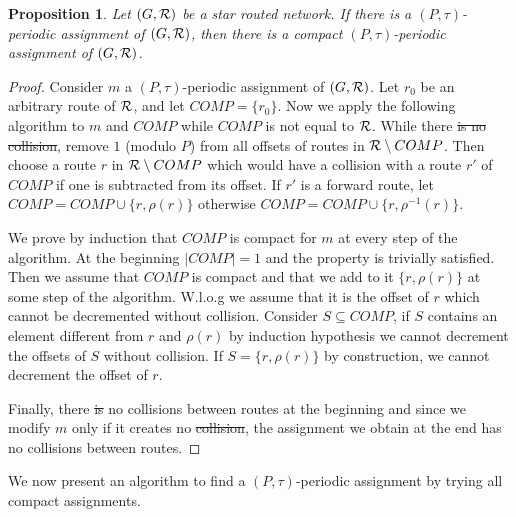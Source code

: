 \documentclass[10pt, conference, letterpaper]{IEEEtran}
\newtheorem{proposition}{Proposition}
\providecommand{\DIFaddtex}[1]{{\protect\color{blue}\uwave{#1}}} %
\providecommand{\DIFdeltex}[1]{{\protect\color{red}\sout{#1}}}                      %
\providecommand{\DIFaddbegin}{} %
\providecommand{\DIFaddend}{} %
\providecommand{\DIFdelbegin}{} %
\providecommand{\DIFdelend}{} %
\providecommand{\DIFadd}[1]{\texorpdfstring{\DIFaddtex{#1}}{#1}} %
\providecommand{\DIFdel}[1]{\texorpdfstring{\DIFdeltex{#1}}{}} %
\newcommand{\DIFscaledelfig}{0.5}
\newlength{\DIFdelgraphicswidth} %
\newlength{\DIFdelgraphicsheight} %
\newcommand{\DIFaddincludegraphics}[2][]{{\color{blue}\fbox{\DIFOincludegraphics[#1]{#2}}}} %
\newcommand{\DIFdelincludegraphics}[2][]{%
\sbox{\DIFdelgraphicsbox}{\DIFOincludegraphics[#1]{#2}}%
\settoboxwidth{\DIFdelgraphicswidth}{\DIFdelgraphicsbox} %
\settoboxtotalheight{\DIFdelgraphicsheight}{\DIFdelgraphicsbox} %
\scalebox{\DIFscaledelfig}{%
\parbox[b]{\DIFdelgraphicswidth}{\usebox{\DIFdelgraphicsbox}\\[-\baselineskip] \rule{\DIFdelgraphicswidth}{0em}}\llap{\resizebox{\DIFdelgraphicswidth}{\DIFdelgraphicsheight}{%
\setlength{\unitlength}{\DIFdelgraphicswidth}%
\begin{picture}(1,1)%
\thicklines\linethickness{2pt} %
{\color[rgb]{1,0,0}\put(0,0){\framebox(1,1){}}}%
{\color[rgb]{1,0,0}\put(0,0){\line( 1,1){1}}}%
{\color[rgb]{1,0,0}\put(0,1){\line(1,-1){1}}}%
\end{picture}%
}\hspace*{3pt}}} %
} %
\DeclareRobustCommand{\DIFaddbegin}{\DIFOaddbegin \let\includegraphics\DIFaddincludegraphics} %
\DeclareRobustCommand{\DIFaddend}{\DIFOaddend \let\includegraphics\DIFOincludegraphics} %
\DeclareRobustCommand{\DIFdelbegin}{\DIFOdelbegin \let\includegraphics\DIFdelincludegraphics} %
\DeclareRobustCommand{\DIFdelend}{\DIFOaddend \let\includegraphics\DIFOincludegraphics} %
\begin{document}
\begin{proposition}
Let $(G, {\cal R})$ be a star routed network. If there is a $(P,\tau)$-periodic assignment of $(G, {\cal R})$, then there is a compact $(P,\tau)$-periodic assignment of $(G, {\cal R})$.
\end{proposition}
\begin{proof}
Consider $m$ a $(P,\tau)$-periodic assignment of $(G, {\cal R})$.
Let $r_0$ be an arbitrary route of ${\cal R}$,  and let $COMP = \{r_0\}$. Now we apply the following algorithm to $m$ and $COMP$ while $COMP$ is not equal to ${\cal R}$.
While there \DIFdelbegin \DIFdel{is no collision}\DIFdelend \DIFaddbegin \DIFadd{are no collisions}\DIFaddend , remove $1$ (modulo $P$) from all offsets of routes in ${\cal R} \setminus COMP$. Then choose a route $r$ in ${\cal R} \setminus COMP$ which would have a collision with a route $r'$ of $COMP$ if one is subtracted from its offset. If $r'$ is a forward route, let $COMP = COMP \cup \{r, \rho(r)\}$ otherwise  $COMP = COMP \cup \{r, \rho^{-1}(r)\}$. 

We prove by induction that $COMP$ is compact for $m$ at every step of the algorithm.
At the beginning $|COMP| = 1$ and the property is trivially satisfied. Then we assume that 
$COMP$ is compact and that we add to it $\{r, \rho(r)\}$ at some step of the algorithm. W.l.o.g we assume that it is the offset of $r$ which cannot be decremented without collision. Consider $S \subseteq   COMP$, if $S$ contains an element different from $r$ and $\rho(r)$ by induction hypothesis we cannot decrement the offsets of $S$ without collision. If $S =\{r, \rho(r)\}$
by construction, we cannot decrement the offset of $r$. 

Finally, there \DIFdelbegin \DIFdel{is }\DIFdelend \DIFaddbegin \DIFadd{are }\DIFaddend no collisions between routes at the beginning and since we modify $m$ only if it creates no \DIFdelbegin \DIFdel{collision}\DIFdelend \DIFaddbegin \DIFadd{collisions}\DIFaddend , the assignment we obtain at the end has no collisions between routes.
\end{proof}

We now present an algorithm to find a $(P,\tau)$-periodic assignment by trying all compact assignments.
\end{document}
